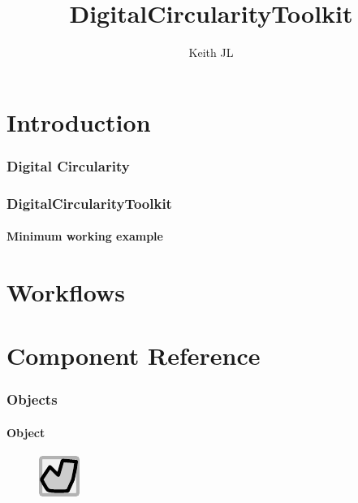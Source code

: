 \documentclass{ol-softwaremanual}
\title{DigitalCircularityToolkit}
\author{Keith JL}
\begin{document}
\maketitle


\tableofcontents
\newpage
\part{Introduction}
\section{Digital Circularity}

\section{DigitalCircularityToolkit}
\subsection{Minimum working example}

\part{Workflows}

\part{Component Reference}
\section{Objects}
\subsection{Object}
\begin{figure}[h]
    \centering
    \includegraphics[width = .5\textwidth]{figures/Icons/OBJECT.pdf}
\end{figure}
\end{document}
